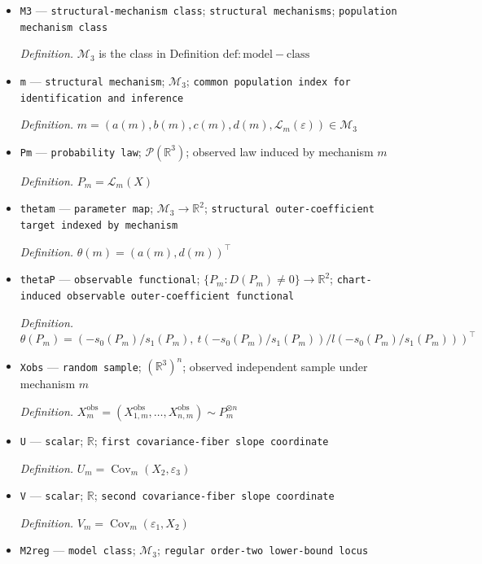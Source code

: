 \documentclass{article}
\begin{document}
\begin{itemize}
  \item \texttt{M3} --- \texttt{structural-\allowbreak{}mechanism class}; \texttt{structural mechanisms}; \texttt{population mechanism class}
  \par\smallskip\noindent\emph{Definition.} \(\mathcal M_3\) is the class in Definition \(\mathrm{def:model-class}\)
  \item \texttt{m} --- \texttt{structural mechanism}; \(\mathcal M_3\); \texttt{common population index for identification and inference}
  \par\smallskip\noindent\emph{Definition.} \(m=(a(m),b(m),c(m),d(m),\mathcal L_m(\varepsilon))\in\mathcal M_3\)
  \item \texttt{Pm} --- \texttt{probability law}; \(\mathcal P(\mathbb R^3)\); observed law induced by mechanism \(m\)
  \par\smallskip\noindent\emph{Definition.} \(P_m=\mathcal L_m(X)\)
  \item \texttt{thetam} --- \texttt{parameter map}; \(\mathcal M_3\to\mathbb R^2\); \texttt{structural outer-\allowbreak{}coefficient target indexed by mechanism}
  \par\smallskip\noindent\emph{Definition.} \(\theta(m)=(a(m),d(m))^\top\)
  \item \texttt{thetaP} --- \texttt{observable functional}; \(\{P_m:D(P_m)\neq0\}\to\mathbb R^2\); \texttt{chart-\allowbreak{}induced observable outer-\allowbreak{}coefficient functional}
  \par\smallskip\noindent\emph{Definition.} \(\theta(P_m)=(-s_0(P_m)/s_1(P_m),\ t(-s_0(P_m)/s_1(P_m))/l(-s_0(P_m)/s_1(P_m)))^\top\)
  \item \texttt{Xobs} --- \texttt{random sample}; \((\mathbb R^3)^n\); observed independent sample under mechanism \(m\)
  \par\smallskip\noindent\emph{Definition.} \(X^{\mathrm{obs}}_m=(X_{1,m}^{\mathrm{obs}},\ldots,X_{n,m}^{\mathrm{obs}})\sim P_m^{\otimes n}\)
  \item \texttt{U} --- \texttt{scalar}; \(\mathbb R\); \texttt{first covariance-\allowbreak{}fiber slope coordinate}
  \par\smallskip\noindent\emph{Definition.} \(U_m=\operatorname{Cov}_m(X_2,\varepsilon_3)\)
  \item \texttt{V} --- \texttt{scalar}; \(\mathbb R\); \texttt{second covariance-\allowbreak{}fiber slope coordinate}
  \par\smallskip\noindent\emph{Definition.} \(V_m=\operatorname{Cov}_m(\varepsilon_1,X_2)\)
  \item \texttt{M2reg} --- \texttt{model class}; \(\mathcal M_3\); \texttt{regular order-\allowbreak{}two lower-\allowbreak{}bound locus}

\end{itemize}
\end{document}
